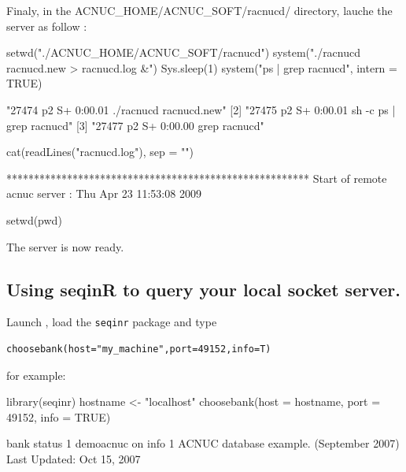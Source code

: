 \documentclass{article}
\begin{document}
Finaly, in the ACNUC\_HOME/ACNUC\_SOFT/racnucd/ directory, lauche the server as follow :

\begin{Schunk}
\begin{Sinput}
 setwd("./ACNUC_HOME/ACNUC_SOFT/racnucd")
 system("./racnucd racnucd.new > racnucd.log &")
 Sys.sleep(1)
 system("ps | grep racnucd", intern = TRUE)
\end{Sinput}
\begin{Soutput}
[1] "27474  p2  S+     0:00.01 ./racnucd racnucd.new"  
[2] "27475  p2  S+     0:00.01 sh -c ps | grep racnucd"
[3] "27477  p2  S+     0:00.00 grep racnucd"           
\end{Soutput}
\begin{Sinput}
 cat(readLines("racnucd.log"), sep = "\n")
\end{Sinput}
\begin{Soutput}
*******************************************************
Start of remote acnuc server : Thu Apr 23 11:53:08 2009
\end{Soutput}
\begin{Sinput}
 setwd(pwd)
\end{Sinput}
\end{Schunk}

The server is now ready.

\subsection{Using seqinR to query your local socket server.}

Launch \Rlogo{}, load the \texttt{seqinr} package  and type


\begin{verbatim}
choosebank(host="my_machine",port=49152,info=T)
\end{verbatim}

for example:


\begin{Schunk}
\begin{Sinput}
 library(seqinr)
 hostname <- "localhost"
 choosebank(host = hostname, port = 49152, info = TRUE)
\end{Sinput}
\begin{Soutput}
       bank status
1 demoacnuc     on
                                                                 info
1 ACNUC database example. (September 2007) Last Updated: Oct 15, 2007
\end{Soutput}
\end{Schunk}
\end{document}
